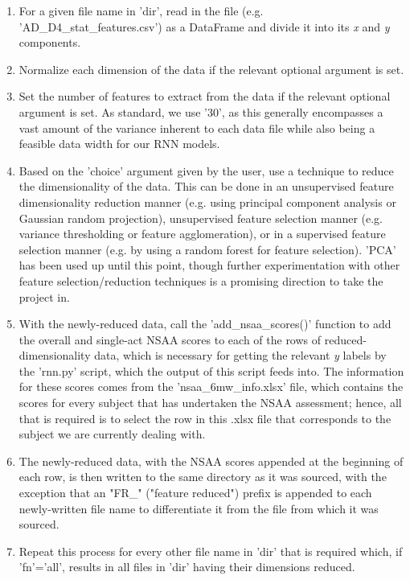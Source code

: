 \documentclass[12pt,twoside]{report}
\begin{document}
\begin{enumerate}
	\item For a given file name in 'dir', read in the file (e.g. 'AD\_D4\_stat\_features.csv') as a DataFrame and divide it into its \textit{x} and \textit{y} components.
	\item Normalize each dimension of the data if the relevant optional argument is set.
	\item Set the number of features to extract from the data if the relevant optional argument is set. As standard, we use '30', as this generally encompasses a vast amount of the variance inherent to each data file while also being a feasible data width for our RNN models.
	\item Based on the 'choice' argument given by the user, use a technique to reduce the dimensionality of the data. This can be done in an unsupervised feature dimensionality reduction manner (e.g. using principal component analysis or Gaussian random projection), unsupervised feature selection manner (e.g. variance thresholding or feature agglomeration), or in a supervised feature selection manner (e.g. by using a random forest for feature selection). 'PCA' has been used up until this point, though further experimentation with other feature selection/reduction techniques is a promising direction to take the project in.
	\item With the newly-reduced data, call the 'add\_nsaa\_scores()' function to add the overall and single-act NSAA scores to each of the rows of reduced-dimensionality data, which is necessary for getting the relevant \textit{y} labels by the 'rnn.py' script, which the output of this script feeds into. The information for these scores comes from the 'nsaa\_6mw\_info.xlsx' file, which contains the scores for every subject that has undertaken the NSAA assessment; hence, all that is required is to select the row in this .xlsx file that corresponds to the subject we are currently dealing with.
	\item The newly-reduced data, with the NSAA scores appended at the beginning of each row, is then written to the same directory as it was sourced, with the exception that an "FR\_" ("feature reduced") prefix is appended to each newly-written file name to differentiate it from the file from which it was sourced.
	\item Repeat this process for every other file name in 'dir' that is required which, if 'fn'=’all’, results in all files in 'dir' having their dimensions reduced.
\end{enumerate}
\end{document}
